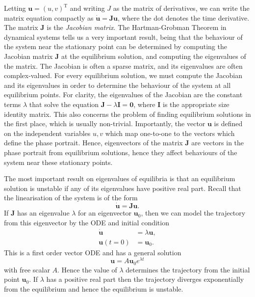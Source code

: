 \documentclass{report}
\begin{document}
Letting \(\mathbf{u} = (u,v)^\mathrm{T}\) and writing \(J\) as the matrix of derivatives,
we can write the matrix equation compactly as \( \dot{\mathbf{u}} = \mathbf{Ju}\), where the dot denotes the time derivative.
The matrix \(\mathbf{J}\) is the \textit{Jacobian matrix}.
The Hartman-Grobman Theorem in dynamical systems tells us a very important result,
being that the behaviour of the system near the stationary point can be determined by computing the Jacobian matrix \(\mathbf{J}\) at the equilibrium solution,
and computing the eigenvalues of the matrix.
The Jacobian is often a sparse matrix, and its eigenvalues are often complex-valued.
For every equilibrium solution, we must compute the Jacobian and its eigenvalues in order to determine the behaviour of the system at all equilibrium points.
For clarity, the eigenvalues of the Jacobian are the constant terms \(\lambda\) that solve the equation \( \mathbf{J} -  \lambda \mathbf{I} = \mathbf{0}\),
where \(\mathbf{I}\) is the appropriate size identity matrix.
This also concerns the problem of finding equilibrium solutions in the first place, which is usually non-trivial.
Importantly, the vector $\mathbf{u}$ is defined on the independent variables $u,v$ which map one-to-one to the vectors which define the phase portrait.
Hence, eigenvectors of the matrix $\mathbf{J}$ are vectors in the phase portrait from equilibrium solutions,
hence they affect behaviours of the system near these stationary points.

The most important result on eigenvalues of equilibria is that an equilibrium solution is unstable if any of its eigenvalues have positive real part.
Recall that the linearisation of the system is of the form
\begin{equation}
	\dot{\mathbf{u}} = \mathbf{Ju}.
\end{equation}
If $\mathbf{J}$ has an eigenvalue $\lambda$ for an eigenvector $\mathbf{u}_0$,
then we can model the trajectory from this eigenvector by the ODE and initial condition
\begin{equation*}
	\begin{aligned}
		\dot{\mathbf{u}} &= \lambda \mathbf{u}, \\
		\mathbf{u}(t=0) &= \mathbf{u}_0.
	\end{aligned}
\end{equation*}
This is a first order vector ODE and has a general solution
\begin{equation}
	\mathbf{u} = A\mathbf{u}_0 e^{\lambda t}
\end{equation}
with free scalar $A$.
Hence the value of $\lambda$ determines the trajectory from the initial point $\mathbf{u}_0$.
If $\lambda$ has a positive real part then the trajectory diverges exponentially from the equilibrium and hence the equilibrium is unstable.
\end{document}
